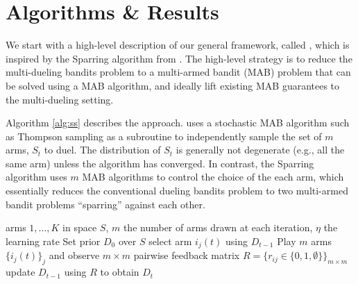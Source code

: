
\section{Algorithms \& Results}
\label{sec:algorithm}

We start with a high-level description of our general framework, called \selfsparring, which is inspired by the Sparring algorithm from \citet{ailon2014reducing}.  The high-level strategy is to reduce the multi-dueling bandits problem to a multi-armed bandit (MAB) problem that can be solved using a MAB algorithm, and ideally lift existing MAB guarantees to the multi-dueling setting.

Algorithm \ref{alg:ss} describes the \selfsparring approach. 
\selfsparring uses a stochastic MAB algorithm such as Thompson sampling as a subroutine to independently sample the set of $m$ arms, $S_t$ to duel.  The distribution of $S_t$ is generally not degenerate (e.g., all the same arm) unless the algorithm has converged.   In contrast, the Sparring algorithm uses $m$ MAB algorithms to control the choice of the each arm, which essentially reduces the conventional dueling bandits problem to two multi-armed bandit problems ``sparring'' against each other. %


 \begin{algorithm}[tb]
     \caption{\selfsparring}
     \label{alg:ss}
 \begin{algorithmic}[1]
     \INPUT arms $1, \ldots, K$ in space $S$, $m$ the number of arms drawn at each iteration, $\eta$ the learning rate
     \STATE Set prior $D_0$ over $S$
         \STATE select arm $i_j(t)$ using $D_{t-1}$ \label{lin:sample}
 	   \ENDFOR
	   \STATE Play $m$ arms $\{i_j(t)\}_j$ and observe $m\times m$ pairwise feedback matrix $R = \{r_{ij} \in \{0,1,\emptyset\}\}_{m \times m}$
       \STATE update $D_{t-1}$ using $R$ to obtain $D_t$
     \ENDFOR
 \end{algorithmic}
 \end{algorithm}

